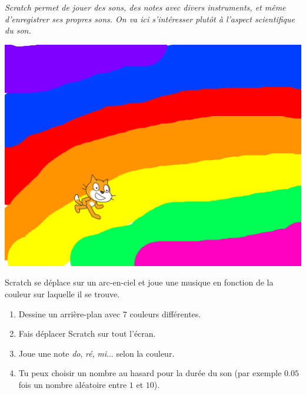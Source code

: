 \documentclass[class=report,crop=false, 12pt]{standalone}
\begin{document}




\bigskip
\bigskip

\emph{Scratch permet de jouer des sons, des notes avec divers instruments, et même d'enregistrer ses propres sons. On va ici s'intéresser plutôt à l'aspect scientifique du son.}

\bigskip
\bigskip



\begin{activite}

\sauteligne

\begin{center}
  \includegraphics[scale=\scaleecran,scale=0.85]{ecran-09-ex1} 
\end{center}

Scratch se déplace sur un arc-en-ciel et joue une musique en fonction de la couleur sur laquelle il se trouve.

\begin{enumerate}
  \item Dessine un arrière-plan avec 7 couleurs différentes.
  \item Fais déplacer Scratch sur tout l'écran.
  \item Joue une note \emph{do}, \emph{ré}, \emph{mi}... selon la couleur. 
  \item Tu peux choisir un nombre au hasard pour la durée du son  
  (par exemple $0.05$ fois un nombre aléatoire entre $1$ et $10$). 
\end{enumerate}


\end{activite}
\end{document}
